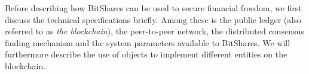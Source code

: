 Before describing how BitShares can be used to secure financial freedom, we
first discuss the technical specifications briefly. Among these is the public
ledger (also referred to as \emph{the blockchain}), the peer-to-peer network,
the distributed consensus finding mechanism and the system parameters available
to BitShares. We will furthermore describe the use of objects to implement
different entities on the blockchain.
